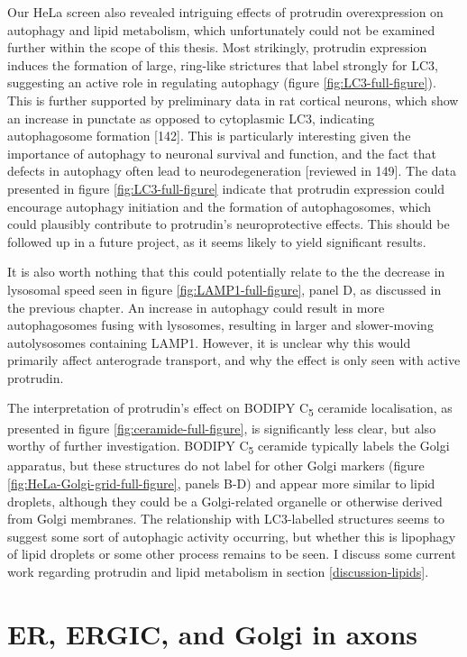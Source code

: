 \documentclass[
  12pt,
  a4paper,
]{book}
\begin{document}
Our HeLa screen also revealed intriguing effects of protrudin overexpression on autophagy and lipid metabolism, which unfortunately could not be examined further within the scope of this thesis. Most strikingly, protrudin expression induces the formation of large, ring-like strictures that label strongly for LC3, suggesting an active role in regulating autophagy (figure \ref{fig:LC3-full-figure}). This is further supported by preliminary data in rat cortical neurons, which show an increase in punctate as opposed to cytoplasmic LC3, indicating autophagosome formation {[}142{]}. This is particularly interesting given the importance of autophagy to neuronal survival and function, and the fact that defects in autophagy often lead to neurodegeneration {[}reviewed in 149{]}. The data presented in figure \ref{fig:LC3-full-figure} indicate that protrudin expression could encourage autophagy initiation and the formation of autophagosomes, which could plausibly contribute to protrudin's neuroprotective effects. This should be followed up in a future project, as it seems likely to yield significant results.

It is also worth nothing that this could potentially relate to the the decrease in lysosomal speed seen in figure \ref{fig:LAMP1-full-figure}, panel D, as discussed in the previous chapter. An increase in autophagy could result in more autophagosomes fusing with lysosomes, resulting in larger and slower-moving autolysosomes containing LAMP1. However, it is unclear why this would primarily affect anterograde transport, and why the effect is only seen with active protrudin.

The interpretation of protrudin's effect on BODIPY C\textsubscript{5} ceramide localisation, as presented in figure \ref{fig:ceramide-full-figure}, is significantly less clear, but also worthy of further investigation. BODIPY C\textsubscript{5} ceramide typically labels the Golgi apparatus, but these structures do not label for other Golgi markers (figure \ref{fig:HeLa-Golgi-grid-full-figure}, panels B-D) and appear more similar to lipid droplets, although they could be a Golgi-related organelle or otherwise derived from Golgi membranes. The relationship with LC3-labelled structures seems to suggest some sort of autophagic activity occurring, but whether this is lipophagy of lipid droplets or some other process remains to be seen. I discuss some current work regarding protrudin and lipid metabolism in section \ref{discussion-lipids}.

\hypertarget{er-ergic-and-golgi-in-axons}{%
\chapter{ER, ERGIC, and Golgi in axons}\label{er-ergic-and-golgi-in-axons}}
\end{document}
